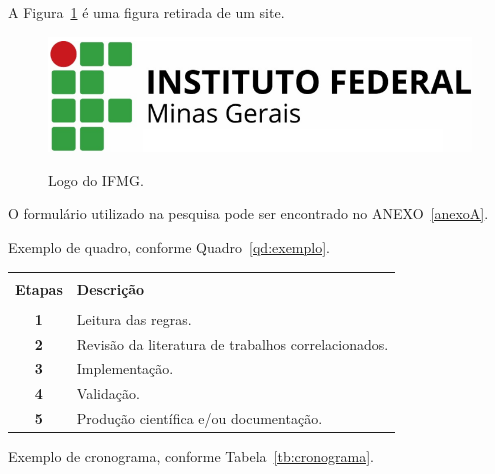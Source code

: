 A Figura~\ref{fig:ifmg} é uma figura retirada de um site.

\begin{figure}[H] %
   \begin{center}
    \caption{Logo do IFMG.} %
    \label{fig:ifmg}
    \includegraphics[width=0.5\linewidth]{Figuras/ifmg.png} \\
    \end{center}
    \fontsize{10}{12}
\end{figure}




O formulário utilizado na pesquisa pode ser encontrado no ANEXO~\ref{anexoA}.

Exemplo de quadro, conforme Quadro~\ref{qd:exemplo}.

\begin{quadro}[htb]
  \centering
  \caption{Exemplo de quadro.}\label{qd:exemplo}
  \begin{tabular}{cp{12cm}}
    \hline \hline &\\[-0.4cm]
    \textbf{Etapas} & \textbf{Descrição} \\
    \hline
    &\\[-0.4cm]
    \textbf{1} & Leitura das regras. \\[0.2cm]
    \textbf{2} & Revisão da literatura de trabalhos correlacionados. \\[0.2cm]
    \textbf{3}& Implementação.\\[0.2cm]
    \textbf{4} & Validação. \\[0.2cm]
    \textbf{5} & Produção científica e/ou documentação.\\[0.2cm]
    \hline \hline
  \end{tabular}
\end{quadro}


Exemplo de cronograma, conforme Tabela~\ref{tb:cronograma}.

